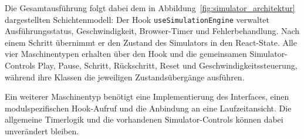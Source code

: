 Die Gesamtausführung folgt dabei dem in Abbildung~\ref{fig:simulator_architektur} dargestellten Schichtenmodell: Der Hook \verb|useSimulationEngine| verwaltet Ausführungsstatus, Geschwindigkeit, Browser-Timer und Fehlerbehandlung. Nach einem Schritt übernimmt er den Zustand des Simulators in den React-State. Alle vier Maschinentypen erhalten über den Hook und die gemeinsamen Simulator-Controls Play, Pause, Schritt, Rückschritt, Reset und Geschwindigkeitssteuerung, während ihre Klassen die jeweiligen Zustandsübergänge ausführen.

Ein weiterer Maschinentyp benötigt eine Implementierung des Interfaces, einen modulspezifischen Hook-Aufruf und die Anbindung an eine Laufzeitansicht. Die allgemeine Timerlogik und die vorhandenen Simulator-Controls können dabei unverändert bleiben.
